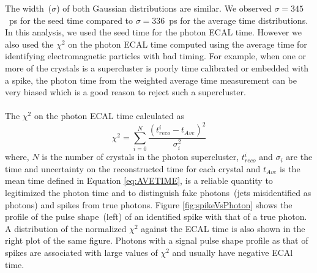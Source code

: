 \vspace{5mm}
The width~($\sigma$) of both Gaussian distributions are similar. We observed $\sigma = 345$~ps for the seed time compared to $\sigma = 336$~ps for the average time distributions. 
\newline
In this analysis, we used the seed time for the photon ECAL time. However we also used the $\chi^{2}$ on the photon ECAL time computed using the average time for identifying electromagnetic particles with bad timing. For example, when one or more of the crystals is a supercluster is poorly time calibrated or embedded with a spike, the photon time from the weighted average time measurement can be very biased which is a good reason to  reject such a supercluster.
\paragraph*{}
The $\chi^{2}$ on the photon ECAL time calculated as
\begin{equation}\label{eq:CHI2}
\chi^{2} = \sum^{N}_{i=0}\frac{(t^{i}_{reco} - t_{Ave})^{2}}{\sigma_{i}^{2}}
\end{equation}
where, $N$ is the number of crystals in the photon supercluster, $t^{i}_{reco}$ and $\sigma_{i}$ are the time and uncertainty on the reconstructed time for each crystal and $t_{Ave}$ is the mean time defined in Equation \ref{eq:AVETIME}, is a reliable quantity to legitimized the photon time and to distinguish fake photons~(jets misidentified as photons) and spikes from true photons. Figure  \ref{fig:spikeVsPhoton} shows the profile of the pulse shape~(left) of an identified spike with that of a true photon. A distribution of the normalized $\chi^{2}$ against the ECAL time is also shown in the right plot of the same figure. Photons with a signal pulse shape profile as that of spikes are associated with large values of $\chi^{2}$ and usually have negative ECAl time.
 
